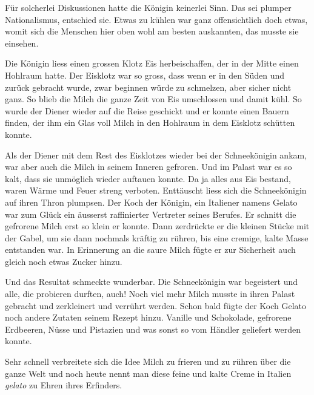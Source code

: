 Für solcherlei Diskussionen hatte die Königin keinerlei Sinn. Das sei plumper Nationalismus, entschied sie. Etwas zu kühlen war ganz offensichtlich doch etwas, womit sich die Menschen hier oben wohl am besten auskannten, das musste sie einsehen. 

Die Königin liess einen grossen Klotz Eis herbeischaffen, der in der Mitte einen Hohlraum hatte. Der Eisklotz war so gross, dass wenn er in den Süden und zurück gebracht wurde, zwar beginnen würde zu schmelzen, aber sicher nicht ganz. So blieb die Milch die ganze Zeit von Eis umschlossen und damit kühl. So wurde der Diener wieder auf die Reise geschickt und er konnte einen Bauern finden, der ihm ein Glas voll Milch in den Hohlraum in dem Eisklotz schütten konnte.

Als der Diener mit dem Rest des Eisklotzes wieder bei der Schneekönigin ankam, war aber auch die Milch in seinem Inneren gefroren. Und im Palast war es so kalt, dass sie unmöglich wieder auftauen konnte. Da ja alles aus Eis bestand, waren Wärme und Feuer streng verboten. Enttäuscht liess sich die Schneekönigin auf ihren Thron plumpsen. Der Koch der Königin, ein Italiener namens Gelato war zum Glück ein äusserst raffinierter Vertreter seines Berufes. Er schnitt die gefrorene Milch erst so klein er konnte. Dann zerdrückte er die kleinen Stücke mit der Gabel, um sie dann nochmals kräftig zu rühren, bis eine cremige, kalte Masse entstanden war. In Erinnerung an die saure Milch fügte er zur Sicherheit auch gleich noch etwas Zucker hinzu.

Und das Resultat schmeckte wunderbar. Die Schneekönigin war begeistert und alle, die probieren durften, auch! Noch viel mehr Milch musste in ihren Palast gebracht und zerkleinert und verrührt werden. Schon bald fügte der Koch Gelato noch andere Zutaten seinem Rezept hinzu. Vanille und Schokolade, gefrorene Erdbeeren, Nüsse und Pistazien und was sonst so vom Händler geliefert werden konnte.

Sehr schnell verbreitete sich die Idee Milch zu frieren und zu rühren über die ganze Welt und noch heute nennt man diese feine und kalte Creme in Italien {\itshape gelato} zu Ehren ihres Erfinders.  \hfill {\color{red}\decofourleft}

